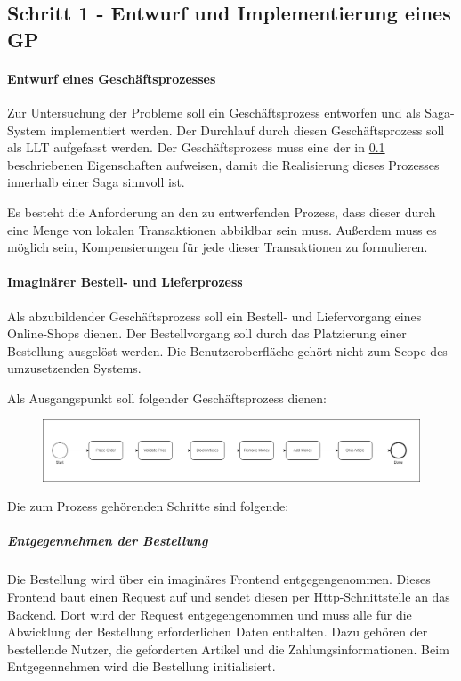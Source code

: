 \subsection{Schritt 1 - Entwurf und Implementierung eines GP}


\paragraph*{Entwurf eines Geschäftsprozesses}

Zur Untersuchung der Probleme soll ein Geschäftsprozess entworfen und als Saga-System implementiert werden. Der Durchlauf durch diesen Geschäftsprozess soll als LLT aufgefasst werden. Der Geschäftsprozess muss eine der in \ref{} beschriebenen Eigenschaften aufweisen, damit die Realisierung dieses Prozesses innerhalb einer Saga sinnvoll ist.  

Es besteht die Anforderung an den zu entwerfenden Prozess, dass dieser durch eine Menge von lokalen Transaktionen abbildbar sein muss. Außerdem muss es möglich sein, Kompensierungen für jede dieser Transaktionen zu formulieren. 

\paragraph*{Imaginärer Bestell- und Lieferprozess}

Als abzubildender Geschäftsprozess soll ein Bestell- und Liefervorgang eines Online-Shops dienen. Der Bestellvorgang soll durch das Platzierung einer Bestellung ausgelöst werden. Die Benutzeroberfläche gehört nicht zum Scope des umzusetzenden Systems. 

Als Ausgangspunkt soll folgender Geschäftsprozess dienen:

\begin{figure}[h!]
	\includegraphics[width=\linewidth]{figures/SimplifiedBusinessProcess.png}
\end{figure}



Die zum Prozess gehörenden Schritte sind folgende:

\subparagraph*{Entgegennehmen der Bestellung} Die Bestellung wird über ein imaginäres Frontend entgegengenommen. Dieses Frontend baut einen Request auf und sendet diesen per Http-Schnittstelle an das Backend. Dort wird der Request entgegengenommen und muss alle für die Abwicklung der Bestellung erforderlichen Daten enthalten. Dazu gehören der bestellende Nutzer, die geforderten Artikel und die Zahlungsinformationen. Beim Entgegennehmen wird die Bestellung initialisiert.

